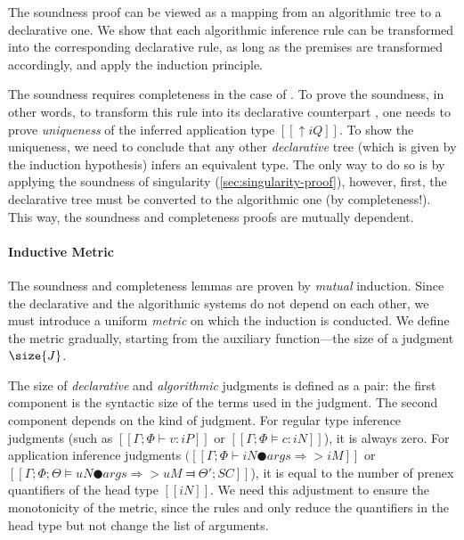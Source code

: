 The soundness proof can be viewed as a mapping from an algorithmic tree to a
declarative one. We show that each algorithmic inference rule can
be transformed into the corresponding declarative rule, as long as the premises
are transformed accordingly, and apply the induction principle. 

The soundness requires completeness in the case of
. To prove the soundness, 
in other words, to transform this rule into its
declarative counterpart , one needs
to prove \emph{uniqueness} of the inferred application type $[[↑iQ]]$. 
To show the uniqueness, we need to conclude that any other \emph{declarative} tree
(which is given by the induction hypothesis) infers an equivalent type. 
The only way to do so is by applying the soundness of singularity (\cref{sec:singularity-proof}), 
however, first, the declarative tree must be converted to the algorithmic one (by completeness!).
This way, the soundness and completeness proofs are mutually dependent.

\paragraph{Inductive Metric}
    The soundness and completeness lemmas are proven by \emph{mutual} induction. 
    Since the declarative and the algorithmic systems do not depend on each other,
    we must introduce a uniform \emph{metric} on which the induction is conducted.
    We define the metric gradually, starting from the
    auxiliary function---the size of a judgment $\size{J}$.

    The size of \emph{declarative} and \emph{algorithmic} judgments is defined as
    a pair: the first component is the syntactic size of the terms used in the judgment. 
    The second component depends on the kind of judgment. For regular
    type inference judgments (such as $[[Γ ; Φ ⊢ v : iP]]$
    or $[[Γ ; Φ ⊨ c : iN]]$), it is always zero. For application inference judgments
    $([[Γ ; Φ ⊢ iN ● args ⇒> iM]]$ or $[[Γ ; Φ ; Θ ⊨ uN ● args ⇒> uM ⫤ Θ'; SC]]$), 
    it is equal to the number of prenex quantifiers of the head type $[[iN]]$.
    We need this adjustment to ensure the monotonicity of the metric, since the rules 
     and 
    only reduce the quantifiers in the head type but not change the list of arguments.

